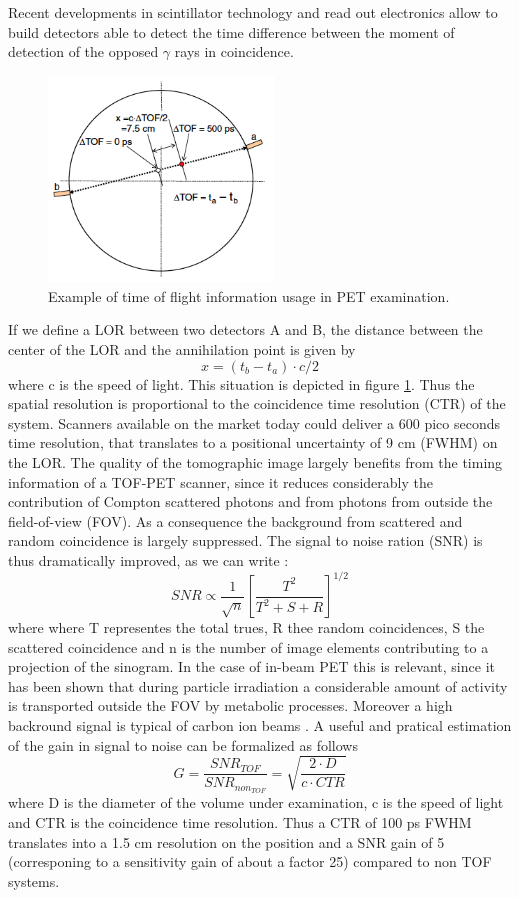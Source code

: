 Recent developments in scintillator technology and read out electronics allow to build detectors able to detect the time difference between the moment of detection of the opposed $\gamma$ rays in coincidence. 
\begin{figure}
\centering  
\includegraphics[width=6cm]{Pictures/Chapter_1/TOF}
\caption[TOF-PET schematics]{Example of time of flight information usage in PET examination.}
\label{fig:TOF}
\end{figure}
If we define a LOR between two detectors A and B, the distance between the center of the LOR and the annihilation point is given by
\begin{equation}
x = (t_{b}-t_{a} ) \cdot c/2
\end{equation}
where c is the speed of light. This situation is depicted in figure \ref{fig:TOF}.
Thus the spatial resolution is proportional to the coincidence time resolution (CTR) of the system.
Scanners available on the market today could deliver a 600 pico seconds time resolution, that translates to a positional uncertainty of 9 cm (FWHM) on the LOR.
The quality of the tomographic image largely benefits from the timing information of a TOF-PET scanner, since it reduces considerably  the contribution of Compton scattered photons and from photons from outside the field-of-view (FOV).
As a consequence the background from scattered and random coincidence is largely suppressed. 
The signal to noise ration (SNR) is thus dramatically improved, as we can write \cite{Karp2008}:
\begin{equation}
SNR \propto \frac{1}{\sqrt{n}}\left[ \frac{T^{2}}{T^{2} + S + R} \right]^{1/2}
\end{equation}
where where T representes the total trues, R thee random coincidences, S the scattered coincidence and n is the number of image elements contributing to a projection of the sinogram.
In the case of in-beam PET this is relevant, since it has been shown \cite{Fiedler2006} that during particle irradiation a considerable amount of activity is transported outside the FOV by metabolic processes. Moreover a high backround signal is typical of carbon ion beams \cite{Enghardt2004}. 
A useful and pratical estimation of the gain in signal to noise can be formalized as follows
\begin{displaymath}
G = \frac{SNR_{TOF}}{SNR_{non_{TOF}}} = \sqrt{\frac{2\cdot D}{c \cdot CTR}}
\end{displaymath}
where D is the diameter of the volume under examination, c is the speed of light and CTR is the coincidence time resolution. Thus a CTR of 100 ps FWHM translates into a 1.5 cm resolution on the position and a SNR gain of 5 (corresponing to a sensitivity gain of about a factor 25) compared to non TOF systems.

